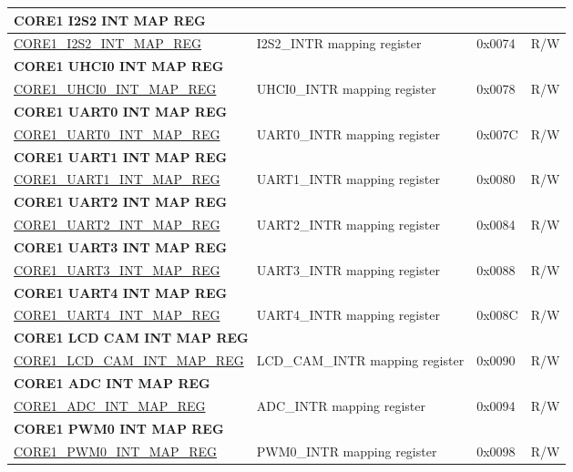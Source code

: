 \begin{longtable}{ | p{7.5cm} | p{7.2cm} | p{1.3cm} | p{1cm} | }
\multicolumn{4}{|l|}{\textbf{CORE1 I2S2 INT MAP REG}} \\ \hline
\hyperref[regdesc:CORE1I2S2INTMAPREG]{CORE1\_I2S2\_INT\_MAP\_REG} & I2S2\_INTR mapping register & 0x0074 & R/W \\ \hline
\multicolumn{4}{|l|}{\textbf{CORE1 UHCI0 INT MAP REG}} \\ \hline
\hyperref[regdesc:CORE1UHCI0INTMAPREG]{CORE1\_UHCI0\_INT\_MAP\_REG} & UHCI0\_INTR mapping register & 0x0078 & R/W \\ \hline
\multicolumn{4}{|l|}{\textbf{CORE1 UART0 INT MAP REG}} \\ \hline
\hyperref[regdesc:CORE1UART0INTMAPREG]{CORE1\_UART0\_INT\_MAP\_REG} & UART0\_INTR mapping register & 0x007C & R/W \\ \hline
\multicolumn{4}{|l|}{\textbf{CORE1 UART1 INT MAP REG}} \\ \hline
\hyperref[regdesc:CORE1UART1INTMAPREG]{CORE1\_UART1\_INT\_MAP\_REG} & UART1\_INTR mapping register & 0x0080 & R/W \\ \hline
\multicolumn{4}{|l|}{\textbf{CORE1 UART2 INT MAP REG}} \\ \hline
\hyperref[regdesc:CORE1UART2INTMAPREG]{CORE1\_UART2\_INT\_MAP\_REG} & UART2\_INTR mapping register & 0x0084 & R/W \\ \hline
\multicolumn{4}{|l|}{\textbf{CORE1 UART3 INT MAP REG}} \\ \hline
\hyperref[regdesc:CORE1UART3INTMAPREG]{CORE1\_UART3\_INT\_MAP\_REG} & UART3\_INTR mapping register & 0x0088 & R/W \\ \hline
\multicolumn{4}{|l|}{\textbf{CORE1 UART4 INT MAP REG}} \\ \hline
\hyperref[regdesc:CORE1UART4INTMAPREG]{CORE1\_UART4\_INT\_MAP\_REG} & UART4\_INTR mapping register & 0x008C & R/W \\ \hline
\multicolumn{4}{|l|}{\textbf{CORE1 LCD CAM INT MAP REG}} \\ \hline
\hyperref[regdesc:CORE1LCDCAMINTMAPREG]{CORE1\_LCD\_CAM\_INT\_MAP\_REG} & LCD\_CAM\_INTR mapping register & 0x0090 & R/W \\ \hline
\multicolumn{4}{|l|}{\textbf{CORE1 ADC INT MAP REG}} \\ \hline
\hyperref[regdesc:CORE1ADCINTMAPREG]{CORE1\_ADC\_INT\_MAP\_REG} & ADC\_INTR mapping register & 0x0094 & R/W \\ \hline
\multicolumn{4}{|l|}{\textbf{CORE1 PWM0 INT MAP REG}} \\ \hline
\hyperref[regdesc:CORE1PWM0INTMAPREG]{CORE1\_PWM0\_INT\_MAP\_REG} & PWM0\_INTR mapping register & 0x0098 & R/W \\ \hline

\end{longtable}
